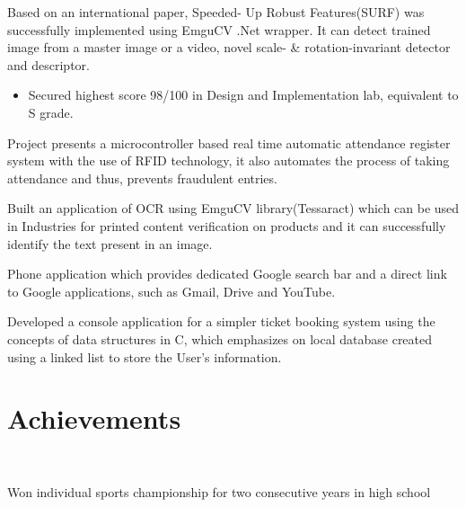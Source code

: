 \documentclass{Resume}
\begin{document}
{Based on an international paper, Speeded- Up Robust Features(SURF) was successfully implemented using EmguCV .Net wrapper. It can detect trained image from a master image or a video, 
novel scale- \& rotation-invariant detector and descriptor.\\}

\begin{itemize}
\item Secured highest score 98/100 in Design and Implementation lab, equivalent to S grade.
\end{itemize}
{ Project presents a microcontroller based real time automatic attendance register system with the use of RFID
technology, it also automates the process of taking attendance and thus, prevents fraudulent entries. \\}

{Built an application of OCR using EmguCV library(Tessaract) which can be used in Industries for printed content verification on products and it can successfully identify the text present in an image. \\}

{Phone application which provides dedicated Google search bar and a direct link to Google applications, such as Gmail, Drive and YouTube.\\}

{Developed a console application for a simpler ticket booking system using the concepts of data structures in C, which emphasizes on local database created using a linked list to store the User's information. }

\section{Achievements \faBullseye}

\\

{Won individual sports championship for two consecutive years in high school}



\section{}
\end{document}
